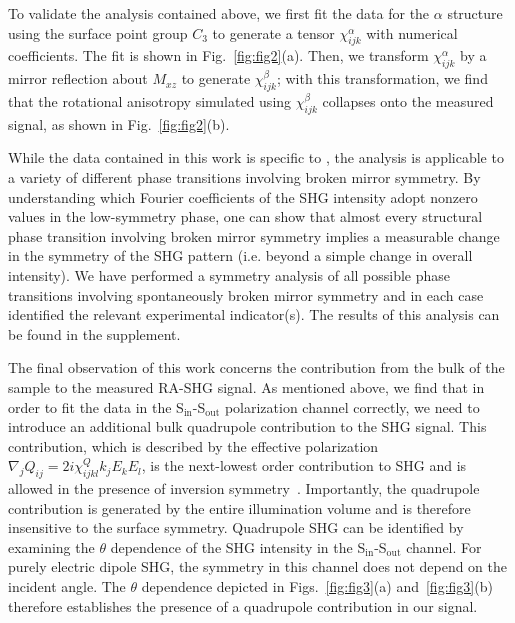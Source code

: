 To validate the analysis contained above, we first fit the data for the $\alpha$ structure using the surface point group $C_{3}$ to generate a tensor $\chi^\alpha_{ijk}$ with numerical coefficients.
The fit is shown in Fig.~\ref{fig:fig2}(a).
Then, we transform $\chi^\alpha_{ijk}$ by a mirror reflection about $M_{xz}$ to generate $\chi_{ijk}^\beta$\cite{supplementary_materials}; with this transformation, we find that the rotational anisotropy simulated using $\chi_{ijk}^\beta$ collapses onto the measured signal, as shown in Fig.~\ref{fig:fig2}(b).

While the data contained in this work is specific to \tastwo, the analysis is applicable to a variety of different phase transitions involving broken mirror symmetry.
By understanding which Fourier coefficients of the SHG intensity adopt nonzero values in the low-symmetry phase, one can show that almost every structural phase transition involving broken mirror symmetry implies a measurable change in the symmetry of the SHG pattern (i.e. beyond a simple change in overall intensity).
We have performed a symmetry analysis of all possible phase transitions involving spontaneously broken mirror symmetry and in each case identified the relevant experimental indicator(s).
The results of this analysis can be found in the supplement\cite{supplementary_materials}.

The final observation of this work concerns the contribution from the bulk of the sample to the measured RA-SHG signal.
As mentioned above, we find that in order to fit the data in the S$_\mathrm{in}$-S$_\mathrm{out}$ polarization channel correctly, we need to introduce an additional bulk quadrupole contribution to the SHG signal.
This contribution, which is described by the effective polarization $\nabla_j Q_{ij} = 2i\chi_{ijkl}^Qk_j E_k E_l$, is the next-lowest order contribution to SHG and is allowed in the presence of inversion symmetry~\cite{kumar_magnetic_2017, shen}.
Importantly, the quadrupole contribution is generated by the entire illumination volume and is therefore insensitive to the surface symmetry.
Quadrupole SHG can be identified by examining the $\theta$ dependence of the SHG intensity in the S$_\mathrm{in}$-S$_\mathrm{out}$ channel.
For purely electric dipole SHG, the symmetry in this channel does not depend on the incident angle.
The $\theta$ dependence depicted in Figs.~\ref{fig:fig3}(a) and~\ref{fig:fig3}(b) therefore establishes the presence of a quadrupole contribution in our signal.

